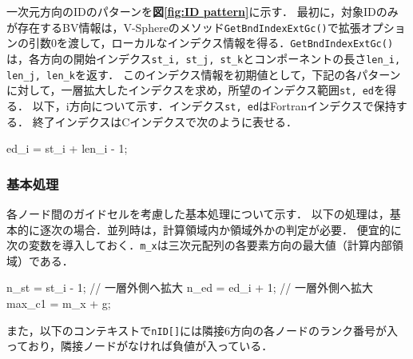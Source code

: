 一次元方向のIDのパターンを\textbf{図\ref{fig:ID pattern}}に示す．
最初に，対象IDのみが存在するBV情報は，V-Sphereのメソッド\verb|GetBndIndexExtGc()|で拡張オプションの引数0を渡して，ローカルなインデクス情報を得る．\verb|GetBndIndexExtGc()|は，各方向の開始インデクス\verb|st_i, st_j, st_k|とコンポーネントの長さ\verb|len_i, len_j, len_k|を返す．
このインデクス情報を初期値として，下記の各パターンに対して，一層拡大したインデクスを求め，所望のインデクス範囲\verb|st, ed|を得る．
以下，i方向について示す．インデクス\verb|st, ed|はFortranインデクスで保持する．
終了インデクスはCインデクスで次のように表せる．
{\small
\begin{program}
ed_i = st_i + len_i - 1;
\end{program}
}

\subsubsection{基本処理}
各ノード間のガイドセルを考慮した基本処理について示す．
以下の処理は，基本的に逐次の場合．並列時は，計算領域内か領域外かの判定が必要．
便宜的に次の変数を導入しておく．\verb|m_x|は三次元配列の各要素方向の最大値（計算内部領域）である．
{\small
\begin{program}
n_st = st_i - 1; // 一層外側へ拡大
n_ed = ed_i + 1; // 一層外側へ拡大
max_c1 = m_x + g;
\end{program}
}

また，以下のコンテキストで\verb|nID[]|には隣接6方向の各ノードのランク番号が入っており，隣接ノードがなければ負値が入っている．

